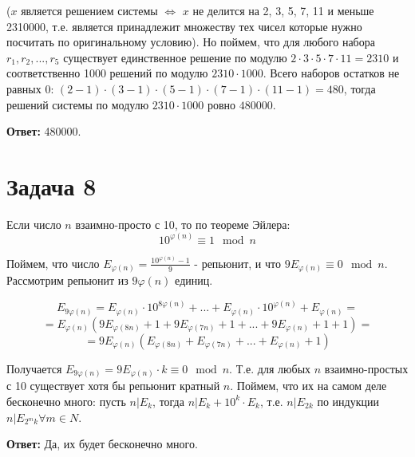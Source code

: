 \documentclass{article}
\begin{document}
			($x$ является решением системы $\Longleftrightarrow$ $x$ не делится на 2, 3, 5, 7, 11 и меньше 2310000, т.е. является принадлежит множеству тех чисел которые нужно посчитать по оригинальному условию). Но поймем, что для любого набора ${r_1, r_2, ..., r_5}$ существует единственное решение по модулю $2 \cdot 3 \cdot 5 \cdot 7 \cdot 11 = 2310$ и соответственно 1000 решений по модулю $2310 \cdot 1000$. Всего наборов остатков не равных 0: $ (2 - 1) \cdot (3 - 1) \cdot (5 - 1) \cdot (7 - 1) \cdot (11 - 1) = 480$, тогда решений системы по модулю $ 2310 \cdot 1000$ ровно $480000$.
		
		 \textbf{Ответ:} 480000.	
		  
		  \section {Задача 8}
		  
		  Если число $n$ взаимно-просто с 10, то по теореме Эйлера:
		  $$ 10^{\varphi(n)} \equiv 1 \mod n$$
		  
		  Поймем, что число $E_{\varphi(n)} = \frac{10^{\varphi(n)} - 1}{9}$ - репьюнит, и что $9E_{\varphi(n)} \equiv 0 \mod n$. Рассмотрим репьюнит из $9\varphi(n)$ единиц. 
		  
		  $$ E_{9\varphi(n)} = E_{\varphi(n)} \cdot 10^{8\varphi(n)} + ... + E_{\varphi(n)} \cdot 10^{\varphi(n)} + E_{\varphi(n)} = $$
		  $$=  E_{\varphi(n)} ( 9E_{\varphi(8n)} + 1 + 9E_{\varphi(7n)} + 1 + ... +  9E_{\varphi(n)} + 1 + 1) = $$
		  $$ = 9E_{\varphi(n)} (E_{\varphi(8n)} + E_{\varphi(7n)} + ... + E_{\varphi(n)} + 1)$$
		  
		  Получается $E_{9\varphi(n)} = 9E_{\varphi(n)} \cdot k \equiv 0 \mod n$. Т.е. для любых $n$ взаимно-простых с 10 существует хотя бы репьюнит кратный $n$. Поймем, что их на самом деле бесконечно много: пусть $n | E_k$, тогда $n | E_k + 10^k \cdot E_k$, т.е. $n | E_{2k}$ по индукции $n | E_{2^mk} \forall m \in N$.
		  
		  \textbf{Ответ:} Да, их будет бесконечно много.
		     
\end{document}
